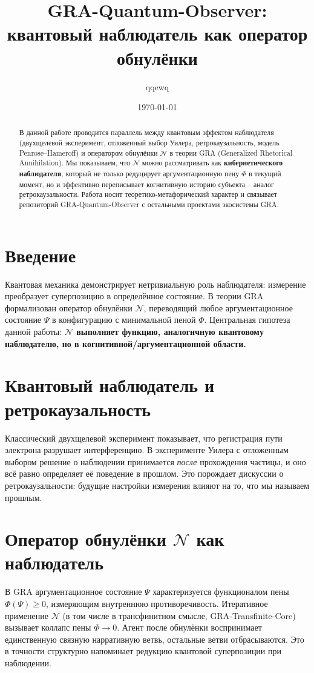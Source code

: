 \documentclass[a4paper,12pt]{article}
\title{GRA-Quantum-Observer: квантовый наблюдатель как оператор обнулёнки}
\author{qqewq}
\date{\today}
\begin{document}
\maketitle

\begin{abstract}
В данной работе проводится параллель между квантовым эффектом наблюдателя (двухщелевой эксперимент, отложенный выбор Уилера, ретрокаузальность, модель Penrose–Hameroff) и оператором обнулёнки $\mathcal{N}$ в теории GRA (Generalized Rhetorical Annihilation). Мы показываем, что $\mathcal{N}$ можно рассматривать как \textbf{кибернетического наблюдателя}, который не только редуцирует аргументационную пену $\Phi$ в текущий момент, но и эффективно переписывает когнитивную историю субъекта – аналог ретрокаузальности. Работа носит теоретико-метафорический характер и связывает репозиторий GRA-Quantum-Observer с остальными проектами экосистемы GRA.
\end{abstract}

\section{Введение}
Квантовая механика демонстрирует нетривиальную роль наблюдателя: измерение преобразует суперпозицию в определённое состояние. В теории GRA формализован оператор обнулёнки $\mathcal{N}$, переводящий любое аргументационное состояние $\Psi$ в конфигурацию с минимальной пеной $\Phi$. Центральная гипотеза данной работы: \textbf{$\mathcal{N}$ выполняет функцию, аналогичную квантовому наблюдателю, но в когнитивной/аргументационной области.}

\section{Квантовый наблюдатель и ретрокаузальность}
Классический двухщелевой эксперимент показывает, что регистрация пути электрона разрушает интерференцию. В эксперименте Уилера с отложенным выбором решение о наблюдении принимается \emph{после} прохождения частицы, и оно всё равно определяет её поведение в прошлом. Это порождает дискуссии о ретрокаузальности: будущие настройки измерения влияют на то, что мы называем прошлым.

\section{Оператор обнулёнки $\mathcal{N}$ как наблюдатель}
В GRA аргументационное состояние $\Psi$ характеризуется функционалом пены $\Phi(\Psi) \ge 0$, измеряющим внутреннюю противоречивость. Итеративное применение $\mathcal{N}$ (в том числе в трансфинитном смысле, GRA-Transfinite-Core) вызывает коллапс пены $\Phi \to 0$. Агент после обнулёнки воспринимает единственную связную нарративную ветвь, остальные ветви отбрасываются. Это в точности структурно напоминает редукцию квантовой суперпозиции при наблюдении.
\end{document}
